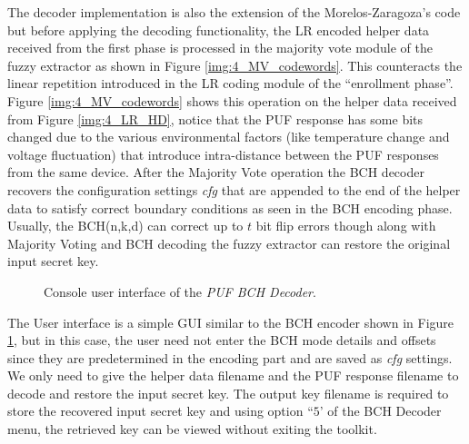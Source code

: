 	The decoder implementation is also the extension of the Morelos-Zaragoza's code \cite{69} but before applying the decoding functionality, the LR encoded helper data received from the first phase is processed in the majority vote module of the fuzzy extractor as shown in Figure \ref{img:4_MV_codewords}. This counteracts the linear repetition introduced in the LR coding module of the ``enrollment phase''. Figure \ref{img:4_MV_codewords} shows this operation on the helper data received from Figure \ref{img:4_LR_HD}, notice that the PUF
	response has some bits changed due to the various environmental factors (like temperature change and voltage fluctuation) that introduce intra-distance between the PUF responses from the same device. After the Majority Vote operation the BCH decoder recovers the configuration settings \emph{cfg} that are appended to the end of the helper data to satisfy correct boundary conditions as seen in the BCH encoding phase. Usually, the BCH(n,k,d) can correct up to $t$ bit flip errors though along with Majority
	Voting and BCH decoding the fuzzy extractor can restore the original input secret key.\\

	\begin{figure}
	\centering
	\caption{Console user interface of the \emph{PUF BCH Decoder}.}
	\label{img:BCH_decoder_GUI}
	\end{figure}
	The User interface is a simple GUI similar to the BCH encoder shown in Figure \ref{img:BCH_decoder_GUI}, but in this case, the user need not enter the BCH mode details and offsets since they are predetermined in the encoding part and are saved as \emph{cfg} settings. We only need to give the helper data filename and the PUF response filename to decode and restore the input secret key. The output key filename is required to store the recovered input secret key and using option ``$5$' of
	the BCH Decoder menu, the retrieved key can be viewed without
	exiting the toolkit.\\

